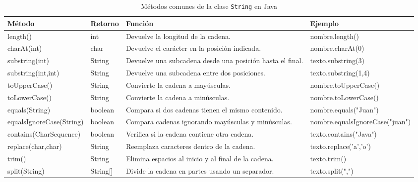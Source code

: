 \documentclass[12pt,twoside]{book}
\begin{document}
						\begin{table}[!hbt]
							\centering
							\caption{Métodos comunes de la clase \texttt{String} en Java}
							\label{tab:stringMetodos}
							
							\begin{tabularx}{\textwidth}{>{\ttfamily}l l X >{\ttfamily}X}
								\toprule
								\textbf{Método} & \textbf{Retorno} & \textbf{Función} & \textbf{Ejemplo} \\
								\midrule
								
								length() & int & Devuelve la longitud de la cadena. &
								nombre.length() \\
								
								charAt(int) & char & Devuelve el carácter en la posición indicada. &
								nombre.charAt(0) \\
								
								substring(int) & String & Devuelve una subcadena desde una posición hasta el final. &
								texto.substring(3) \\
								
								substring(int,int) & String & Devuelve una subcadena entre dos posiciones. &
								texto.substring(1,4) \\
								
								toUpperCase() & String & Convierte la cadena a mayúsculas. &
								nombre.toUpperCase() \\
								
								toLowerCase() & String & Convierte la cadena a minúsculas. &
								nombre.toLowerCase() \\
								
								equals(String) & boolean & Compara si dos cadenas tienen el mismo contenido. &
								nombre.equals("Juan") \\
								
								equalsIgnoreCase(String) & boolean & Compara cadenas ignorando mayúsculas y minúsculas. &
								nombre.equalsIgnoreCase("juan") \\
								
								contains(CharSequence) & boolean & Verifica si la cadena contiene otra cadena. &
								texto.contains("Java") \\
								
								replace(char,char) & String & Reemplaza caracteres dentro de la cadena. &
								texto.replace('a','o') \\
								
								trim() & String & Elimina espacios al inicio y al final de la cadena. &
								texto.trim() \\
								
								split(String) & String[] & Divide la cadena en partes usando un separador. &
								texto.split(",") \\
								
								\bottomrule
							\end{tabularx}
						\end{table}
						
\end{document}
